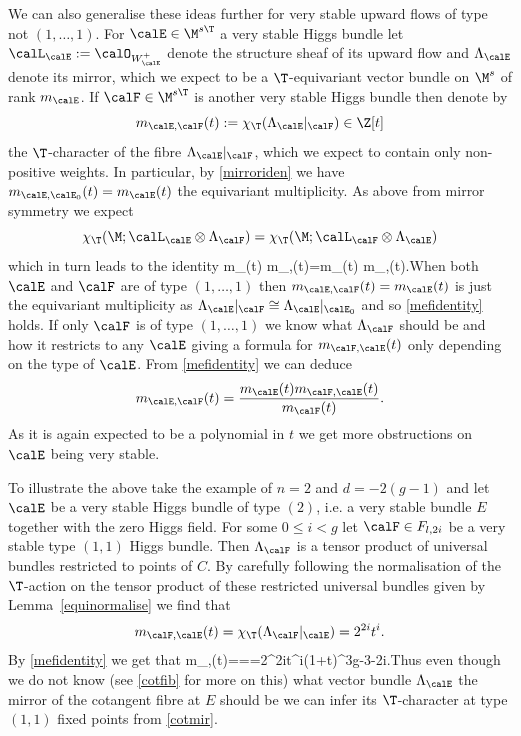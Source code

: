 \begin{remark}
\notready We can also generalise these ideas further for very stable upward flows of type not $(1,\dots,1)$. For  $\calE\in \M^{s\T}$  a very stable Higgs bundle let $\calL_\calE:=\calO_{W^+_\calE}$ denote the structure sheaf of its upward flow and  $\Lambda_\calE$   denote its mirror, which we expect to be a $\T$-equivariant vector bundle on $\M^s$ of rank $m_\calE$. If $\calF\in \M^{s\T}$ is another very stable Higgs bundle then denote by $$m_{\calE,\calF}(t):=\chi_\T(\Lambda_\calE|_\calF)\in \Z[t]$$ the $\T$-character  of the fibre $\Lambda_\calE|_\calF$, which we expect to contain only non-positive weights. In particular,  by \eqref{mirroriden} we have $m_{\calE,\calE_0}(t)= m_\calE(t)$ the equivariant multiplicity. As above from mirror symmetry we expect $$\chi_\T(\M;\calL_\calE\otimes \Lambda_\calF)=\chi_\T(\M;\calL_\calF\otimes \Lambda_\calE)$$ which in turn leads to the identity
	\beq\label{mefidentity} m_\calE(t) m_{\calF,\calE}(t)=m_\calF(t) m_{\calE,\calF}(t).\eeq When both $\calE$ and $\calF$ are of type $(1,\dots,1)$ then $m_{\calE,\calF}(t)=m_\calE(t)$ is just the equivariant multiplicity as $\Lambda_\calE|_{\calF}\cong \Lambda_\calE|_{\calE_0}$  and so \eqref{mefidentity} holds. If only $\calF$ is of type $(1,\dots,1)$ we know what $\Lambda_\calF$ should be and how it restricts to any $\calE$ giving a formula for $m_{\calF,\calE}(t)$ only depending on the type of $\calE$. From \eqref{mefidentity} we can deduce $$m_{\calE,\calF}(t)=\frac{m_\calE(t) m_{\calF,\calE}(t)}{m_\calF(t)}.$$ As it is again expected to be a polynomial in $t$ we get more obstructions on $\calE$ being very stable.

	To illustrate the above take the example of $n=2$ and $d=-2(g-1)$ and let $\calE$ be a very stable Higgs bundle of type $(2)$, i.e. a very stable bundle $E$ together with the zero Higgs field. For some $0\leq i<g$ let $\calF\in F_{l,2i}$ be a very stable type $(1,1)$ Higgs bundle. Then $\Lambda_\calF$ is a tensor product of universal bundles restricted to points of $C$.  By carefully following the normalisation of the $\T$-action on the tensor product of these restricted  universal bundles given by Lemma~\ref{equinormalise} we find that
	$$m_{\calF,\calE}(t)=\chi_\T(\Lambda_\calF|_\calE)=2^{2i}t^i .$$ By \eqref{mefidentity} we get that
	\beq \label{cotmir} m_{\calE,\calF}(t)===2^{2i}t^i(1+t)^{3g-3-2i}.\eeq Thus even though we do not know (see \ref{cotfib} for more on this) what vector bundle $\Lambda_\calE$ the mirror of the cotangent fibre at $E$  should be we can infer its $\T$-character at type $(1,1)$ fixed points  from \eqref{cotmir}.


\end{remark}
